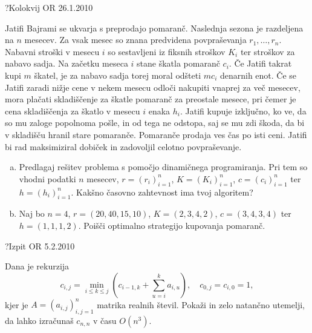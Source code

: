 \begin{naloga}{?}{Kolokvij OR 26.1.2010}
\begin{vprasanje}
Jatifi Bajrami se ukvarja s preprodajo pomaranč.
Naslednja sezona je razdeljena na $n$ mesecev.
Za vsak mesec so znana predvidena povpraševanja $r_1, \dots, r_n$.
Nabavni stroški v mesecu $i$ so sestavljeni iz fiksnih stroškov $K_i$
ter stroškov za nabavo sadja.
Na začetku meseca $i$ stane škatla pomaranč $c_i$.
Če Jatifi takrat kupi $m$ škatel,
je za nabavo sadja torej moral odšteti $mc_i$ denarnih enot.
Če se Jatifi zaradi nižje cene v nekem mesecu
odloči nakupiti vnaprej za več mesecev,
mora plačati skladiščenje za škatle pomaranč za preostale mesece,
pri čemer je cena skladiščenja za škatlo v mesecu $i$ enaka $h_i$.
Jatifi kupuje izključno, ko ve, da so mu zaloge popolnoma pošle,
in od tega ne odstopa, saj se mu zdi škoda,
da bi v skladišču hranil stare pomaranče.
Pomaranče prodaja ves čas po isti ceni.
Jatifi bi rad maksimiziral dobiček in zadovoljil celotno povpraševanje.

\begin{enumerate}[(a)]
\item Predlagaj rešitev problema s pomočjo dinamičnega programiranja.
Pri tem so vhodni podatki $n$ mesecev, $r = (r_i)_{i=1}^n$,
$K = (K_i)_{i=1}^n$, $c = (c_i)_{i=1}^n$ ter $h = (h_i)_{i=1}^n$.
Kakšno časovno zahtevnost ima tvoj algoritem?

\item Naj bo $n = 4$, $r = (20, 40, 15, 10)$, $K = (2, 3, 4, 2)$,
$c = (3, 4, 3, 4)$ ter $h = (1, 1, 1, 2)$.
Poišči optimalno strategijo kupovanja pomaranč.
\end{enumerate}
\end{vprasanje}
\begin{odgovor}
\end{odgovor}
\end{naloga}


\begin{naloga}{?}{Izpit OR 5.2.2010}
\begin{vprasanje}
Dana je rekurzija
$$
c_{i,j} = \min_{i \le k \le j} \left(c_{i-1,k} + \sum_{u=i}^k a_{i,u}\right),
\quad c_{0,j} = c_{i,0} = 1 ,
$$
kjer je $A = (a_{i,j})_{i,j=1}^n$ matrika realnih števil.
Pokaži in zelo natančno utemelji,
da lahko izračunaš $c_{n,n}$ v času $O(n^3)$.
\end{vprasanje}
\begin{odgovor}
\end{odgovor}
\end{naloga}


